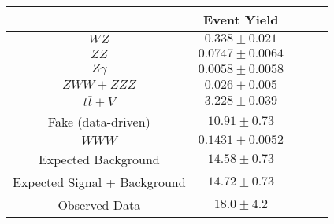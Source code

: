\begin{tabular}{|c||c|c|c|c|}
\hline
 & Event Yield\\ 
\hline\hline
$WZ$ &  $0.338 \pm 0.021$\\ 
$ZZ$ &  $0.0747 \pm 0.0064$\\ 
$Z\gamma$ &  $0.0058 \pm 0.0058$\\ 
$ZWW+ZZZ$ &  $0.026 \pm 0.005$\\ 
$t\bar{t}+V$ &  $3.228 \pm 0.039$\\ 
Fake (data-driven) &  $10.91 \pm 0.73$\\ 
$WWW$ &  $0.1431 \pm 0.0052$\\ 
\hline
Expected Background &  $14.58 \pm 0.73$\\ 
Expected Signal + Background &  $14.72 \pm 0.73$\\ 
\hline
Observed Data &  $18.0 \pm 4.2$\\ 
\hline
\end{tabular}
